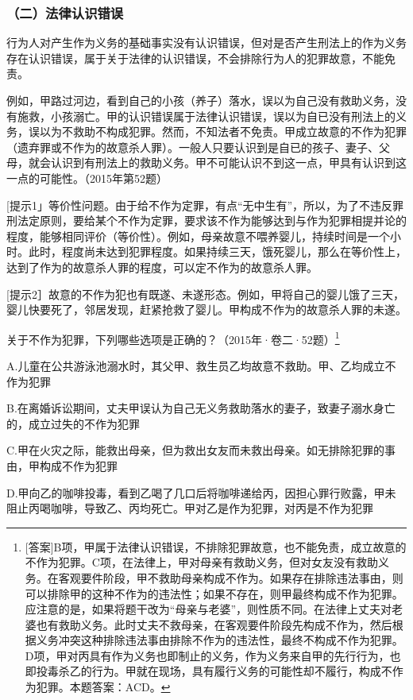 \subsubsection*{（二）法律认识错误}

行为人对产生作为义务的基础事实没有认识错误，但对是否产生刑法上的作为义务存在认识错误，属于关于法律的认识错误，不会排除行为人的犯罪故意，不能免责。

例如，甲路过河边，看到自己的小孩（养子）落水，误以为自己没有救助义务，没有施救，小孩溺亡。甲的认识错误属于法律认识错误，误以为自已没有刑法上的义务，误以为不救助不构成犯罪。然而，不知法者不免责。甲成立故意的不作为犯罪（遗弃罪或不作为的故意杀人罪）。一般人只要认识到是自已的孩子、妻子、父母，就会认识到有刑法上的救助义务。甲不可能认识不到这一点，甲具有认识到这一点的可能性。（2015年第52题）

[提示1」等价性问题。由于给不作为定罪，有点“无中生有”，所以，为了不违反罪刑法定原则，要给某个不作为定罪，要求该不作为能够达到与作为犯罪相提并论的程度，能够相同评价（等价性）。例如，母亲故意不喂养婴儿，持续时间是一个小时。此时，程度尚未达到犯罪程度。如果持续三天，饿死婴儿，那么在等价性上，达到了作为的故意杀人罪的程度，可以定不作为的故意杀人罪。

[提示2］故意的不作为犯也有既遂、未遂形态。例如，甲将自己的婴儿饿了三天，婴儿快要死了，邻居发现，赶紧抢救了婴儿。甲构成不作为的故意杀人罪的未遂。


关于不作为犯罪，下列哪些选项是正确的？（2015年·卷二·52题）\footnote{[答案]B项，甲属于法律认识错误，不排除犯罪故意，也不能免责，成立故意的不作为犯罪。C项，在法律上，甲对母亲有救助义务，但对女友没有救助义务。在客观要件阶段，甲不救助母亲构成不作为。如果存在排除违法事由，则可以排除甲的这种不作为的违法性；如果不存在，则甲最终构成不作为犯罪。应注意的是，如果将题干改为“母亲与老婆”，则性质不同。在法律上丈夫对老婆也有救助义务。此时丈夫不救母亲，在客观要件阶段先构成不作为，然后根据义务冲突这种排除违法事由排除不作为的违法性，最终不构成不作为犯罪。D项，甲对丙具有作为义务也即制止的义务，作为义务来自甲的先行行为，也即投毒杀乙的行为。甲就在现场，具有履行义务的可能性却不履行，构成不作为犯罪。本题答案：ACD。}

A.儿童在公共游泳池溺水时，其父甲、救生员乙均故意不救助。甲、乙均成立不作为犯罪

B.在离婚诉讼期间，丈夫甲误认为自己无义务救助落水的妻子，致妻子溺水身亡的，成立过失的不作为犯罪

C.甲在火灾之际，能救出母亲，但为救出女友而未救出母亲。如无排除犯罪的事由，甲构成不作为犯罪

D.甲向乙的咖啡投毒，看到乙喝了几口后将咖啡递给丙，因担心罪行败露，甲未阻止丙喝咖啡，导致乙、丙均死亡。甲对乙是作为犯罪，对丙是不作为犯罪

